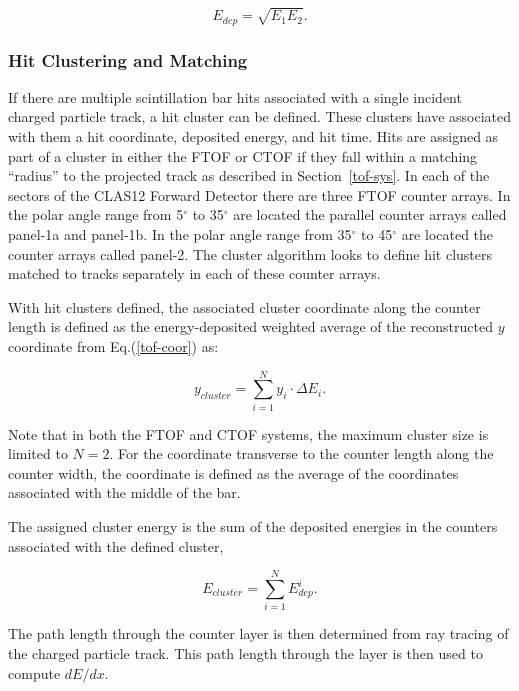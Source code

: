 \begin{equation}
E_{dep} = \sqrt{E_1 E_2}.
\end{equation}

\subsubsection{Hit Clustering and Matching}

If there are multiple scintillation bar hits associated with a single incident charged particle track, a hit cluster
can be defined. These clusters have associated with them a hit coordinate, deposited energy, and hit time.
Hits are assigned as part of a cluster in either the FTOF or CTOF if they fall within a matching ``radius'' to
the projected track as described in Section~\ref{tof-sys}. In each of the sectors of the CLAS12 Forward
Detector there are three FTOF counter arrays. In the polar angle range from 5$^\circ$ to 35$^\circ$ are
located the parallel counter arrays called panel-1a and panel-1b. In the polar angle range from 35$^\circ$ to
45$^\circ$ are located the counter arrays called panel-2. The cluster algorithm looks to define hit clusters
matched to tracks separately in each of these counter arrays.

With hit clusters defined, the associated cluster coordinate along the counter length is defined as the
energy-deposited weighted average of the reconstructed $y$ coordinate from Eq.(\ref{tof-coor}) as:

\begin{equation}
y_{cluster} = \sum_{i=1}^{N} y_i \cdot \Delta E_i.
\end{equation}

\noindent
Note that in both the FTOF and CTOF systems, the maximum cluster size is limited to $N=2$. For the
coordinate transverse to the counter length along the counter width, the coordinate is defined as the average
of the coordinates associated with the middle of the bar.

The assigned cluster energy is the sum of the deposited energies in the counters associated with the defined
cluster,

\begin{equation}
  E_{cluster} = \sum_{i=1}^N E_{dep}^i.
\end{equation}

\noindent
The path length through the counter layer is then determined from ray tracing of the charged particle track.
This path length through the layer is then used to compute $dE/dx$.

